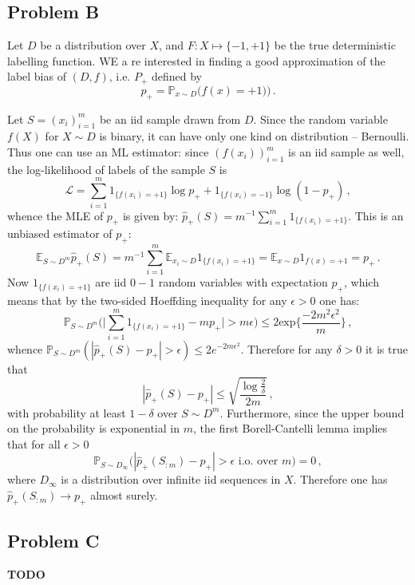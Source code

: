 \documentclass[a4paper]{article}
\newcommand{\ex}{\mathbb{E}}
\newcommand{\pr}{\mathbb{P}}
\begin{document}
\subsection{Problem B} %
\label{sub:problem_1b}

Let $D$ be a distribution over $X$, and $F:X\mapsto\{-1,+1\}$ be the true deterministic
labelling function. WE a re interested in finding a good approximation of the label
bias of $(D, f)$, i.e. $P_+$ defined by
\[ p_+ = \pr_{x\sim D}\bigl(f(x) = +1)\bigr) \,. \]

Let $S=(x_i)_{i=1}^m$ be an iid sample drawn from $D$. Since the random variable
$f(X)$ for $X\sim D$ is binary, it can have only one kind on distribution -- Bernoulli.
Thus one can use an ML estimator: since $(f(x_i))_{i=1}^m$ is an iid sample as well,
the log-likelihood of labels of the sample $S$ is
\[ \mathcal{L} = \sum_{i=1}^m 1_{\{f(x_i)=+1\}} \log p_+ + 1_{\{f(x_i)=-1\}} \log(1-p_+) \,, \]
whence the MLE of $p_+$ is given by: $\hat{p}_+(S) = m^{-1} \sum_{i=1}^m 1_{\{f(x_i)=+1\}}$.
This is an unbiased estimator of $p_+$:
\[ \ex_{S\sim D^m} \hat{p}_+(S)
  = m^{-1} \sum_{i=1}^m \ex_{x_i\sim D} 1_{\{f(x_i)=+1\}} 
  = \ex_{x\sim D} 1_{f(x)=+1} = p_+ \,. \]
Now $1_{\{f(x_i)=+1\}}$ are iid $0-1$ random variables with expectation $p_+$, which
means that by the two-sided Hoeffding inequality for any $\epsilon>0$ one has:
\[ \pr_{S\sim D^m}\bigl(
    \bigl| \sum_{i=1}^m 1_{\{f(x_i)=+1\}} - m p_+ \bigr| > m\epsilon
  \bigr) \leq 2 \text{exp}\biggl\{\frac{-2m^2\epsilon^2}{m}\biggr\}
  \,, \]
whence $\pr_{S\sim D^m}( |\hat{p}_+(S) - p_+| > \epsilon ) \leq 2 e^{-2m\epsilon^2}$.
Therefore for any $\delta>0$ it is true that
\[ |\hat{p}_+(S) - p_+| \leq \sqrt{\frac{\log\frac{2}{\delta}}{2m}} \,, \]
with probability at least $1-\delta$ over $S\sim D^m$.
Furthermore, since the upper bound on the probability is exponential in $m$,
the first Borell-Cantelli lemma implies that for all $\epsilon>0$
\[ \pr_{S\sim D_\infty} \bigl(
  |\hat{p}_+(S_{:m}) - p_+| > \epsilon
    \text{ i.o. over } m \bigr) = 0 \,, \]
where $D_\infty$ is a distribution over infinite iid sequences in $X$. Therefore
one has $\hat{p}_+(S_{:m}) \to p_+$ almost surely.


\subsection{Problem C} %
\label{sub:problem_1c}

\textbf{TODO}
\end{document}
